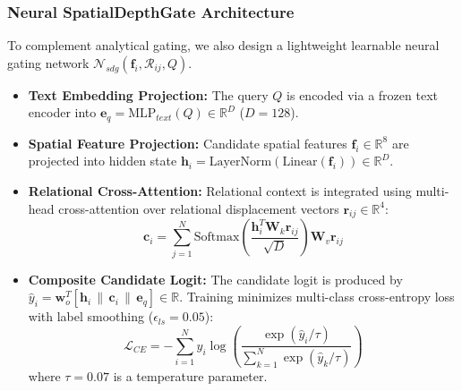 \documentclass[10pt,twocolumn,letterpaper]{article}
\begin{document}
\subsubsection{Neural SpatialDepthGate Architecture}
To complement analytical gating, we also design a lightweight learnable neural gating network $\mathcal{N}_{sdg}(\mathbf{f}_i, \mathcal{R}_{ij}, Q)$. 
\begin{itemize}[leftmargin=*,itemsep=1pt]
    \item \textbf{Text Embedding Projection:} The query $Q$ is encoded via a frozen text encoder into $\mathbf{e}_q = \mathrm{MLP}_{text}(Q) \in \mathbb{R}^D$ ($D = 128$).
    \item \textbf{Spatial Feature Projection:} Candidate spatial features $\mathbf{f}_i \in \mathbb{R}^8$ are projected into hidden state $\mathbf{h}_i = \mathrm{LayerNorm}(\mathrm{Linear}(\mathbf{f}_i)) \in \mathbb{R}^D$.
    \item \textbf{Relational Cross-Attention:} Relational context is integrated using multi-head cross-attention over relational displacement vectors $\mathbf{r}_{ij} \in \mathbb{R}^4$:
    \begin{equation}
    \mathbf{c}_i = \sum_{j=1}^N \mathrm{Softmax}\left(\frac{\mathbf{h}_i^T \mathbf{W}_k \mathbf{r}_{ij}}{\sqrt{D}}\right) \mathbf{W}_v \mathbf{r}_{ij}
    \end{equation}
    \item \textbf{Composite Candidate Logit:} The candidate logit is produced by $\hat{y}_i = \mathbf{w}_o^T [\mathbf{h}_i \,\|\, \mathbf{c}_i \,\|\, \mathbf{e}_q] \in \mathbb{R}$. Training minimizes multi-class cross-entropy loss with label smoothing ($\epsilon_{ls} = 0.05$):
    \begin{equation}
    \mathcal{L}_{CE} = - \sum_{i=1}^N y_i \log \left(\frac{\exp(\hat{y}_i / \tau)}{\sum_{k=1}^N \exp(\hat{y}_k / \tau)}\right)
    \end{equation}
    where $\tau = 0.07$ is a temperature parameter.
\end{itemize}
\end{document}
